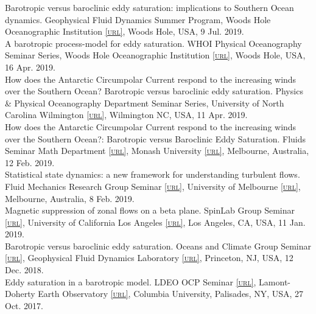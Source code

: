\documentclass[10pt, letter]{article}
\def\www{http://www.navidconstantinou.com}
\newcommand{\html}[1]{\href{#1}{\scriptsize\textsc{[url]}}}
\newcommand{\pdf}[1]{\href{#1}{\scriptsize\textsc{[pdf]}}}
\renewcommand{\pdf}[1]{\href{#1}{{\fontspec{FontAwesome}{}}}}
\newcommand{\years}[1]{\marginnote{\scriptsize #1}}
\begin{document}
Barotropic versus baroclinic eddy saturation: implications to Southern Ocean dynamics. Geophysical Fluid Dynamics Summer Program, Woods Hole Oceanographic Institution \html{https://www.whoi.edu/gfd}, Woods Hole, USA, 9 Jul. 2019. \href{\www/presentations/EddySaturation-GFD-2019.pdf}{{}}\\[.2cm]
A barotropic process-model for eddy saturation. WHOI Physical Oceanography Seminar Series, Woods Hole Oceanographic Institution \html{https://www.whoi.edu}, Woods Hole, USA, 16 Apr. 2019. \href{http://www.navidconstantinou.com/presentations/WHOI_Apr2019.pdf}{{}}\\[.2cm]
How does the Antarctic Circumpolar Current respond to the increasing winds over the Southern Ocean?
Barotropic versus baroclinic eddy saturation. Physics \& Physical Oceanography Department Seminar Series, University of North Carolina Wilmington \html{https://uncw.edu/phy/}, Wilmington NC, USA, 11 Apr. 2019.\\[.2cm]
How does the Antarctic Circumpolar Current respond to the increasing winds over the Southern Ocean?: Barotropic versus Baroclinic Eddy Saturation. Fluids Seminar Math Department \html{https://www.monash.edu/science/schools/mathematical-sciences}, Monash University \html{https://www.monash.edu}, Melbourne, Australia, 12 Feb. 2019.\\[.2cm]
\years{2019} Statistical state dynamics: a new framework for understanding turbulent flows. Fluid Mechanics Research Group Seminar \html{https://fluids.eng.unimelb.edu.au}, University of Melbourne \html{https://www.unimelb.edu.au}, Melbourne, Australia, 8 Feb. 2019.\\[.2cm]
Magnetic suppression of zonal flows on a beta plane. SpinLab Group Seminar \html{http://spinlab.ess.ucla.edu/}, University of California Los Angeles \html{https://www.ucla.edu}, Los Angeles, CA, USA, 11 Jan. 2019.  \pdf{\www/presentations/GFDL_Dec2018.pdf}\\[.2cm]
\years{2018} Barotropic versus baroclinic eddy saturation. Oceans and Climate Group Seminar \html{https://www.gfdl.noaa.gov/ocean-and-cryosphere-division/}, Geophysical Fluid Dynamics Laboratory \html{https://www.gfdl.noaa.gov/}, Princeton, NJ, USA, 12 Dec. 2018.  \pdf{\www/presentations/GFDL_Dec2018.pdf}\\[.2cm]
Eddy saturation in a barotropic model. LDEO OCP Seminar \html{https://www.ldeo.columbia.edu/research/ocean-climate-physics/seminars}, Lamont-Doherty Earth Observatory \html{https://www.ldeo.columbia.edu}, Columbia University, Palisades, NY, USA, 27 Oct. 2017.  \pdf{\www/presentations/CEAFM_Oct2017.pdf}\\[.2cm]
\end{document}

